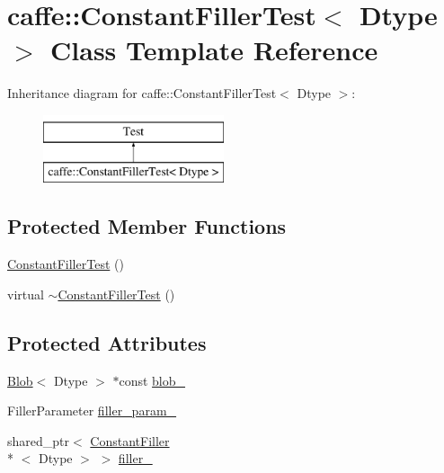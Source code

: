 \hypertarget{classcaffe_1_1_constant_filler_test}{\section{caffe\+:\+:Constant\+Filler\+Test$<$ Dtype $>$ Class Template Reference}
\label{classcaffe_1_1_constant_filler_test}
}
Inheritance diagram for caffe\+:\+:Constant\+Filler\+Test$<$ Dtype $>$\+:\begin{figure}[H]
\begin{center}
\leavevmode
\includegraphics[height=2.000000cm]{classcaffe_1_1_constant_filler_test}
\end{center}
\end{figure}
\subsection*{Protected Member Functions}
\begin{DoxyCompactItemize}
\item 
\hyperlink{classcaffe_1_1_constant_filler_test_a7d87f98846e7e8a811f93c75afb1eb6e}{Constant\+Filler\+Test} ()
\item 
virtual \hyperlink{classcaffe_1_1_constant_filler_test_ace957505dc9394783212875ed4d89d3c}{$\sim$\+Constant\+Filler\+Test} ()
\end{DoxyCompactItemize}
\subsection*{Protected Attributes}
\begin{DoxyCompactItemize}
\item 
\hyperlink{classcaffe_1_1_blob}{Blob}$<$ Dtype $>$ $\ast$const \hyperlink{classcaffe_1_1_constant_filler_test_a3c61da8de712122294a6b0df36f9f6a7}{blob\+\_\+}
\item 
Filler\+Parameter \hyperlink{classcaffe_1_1_constant_filler_test_ae7c14a37c8b6370fc539cd82fb90d972}{filler\+\_\+param\+\_\+}
\item 
shared\+\_\+ptr$<$ \hyperlink{classcaffe_1_1_constant_filler}{Constant\+Filler}\\*
$<$ Dtype $>$ $>$ \hyperlink{classcaffe_1_1_constant_filler_test_adc3aca9d62166a3d14202317bbb89a3d}{filler\+\_\+}
\end{DoxyCompactItemize}


